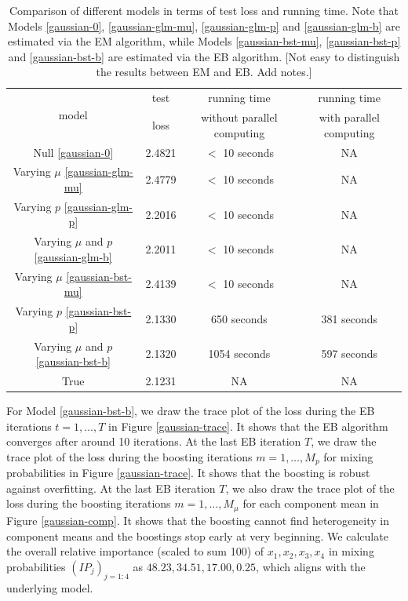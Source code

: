 \documentclass[11pt]{article}
\numberwithin{equation}{section}
\begin{document}
\begin{table}[htp!]
	\caption{Comparison of different models in terms of test loss and running time. Note that Models \eqref{gaussian-0}, \eqref{gaussian-glm-mu}, \eqref{gaussian-glm-p} and \eqref{gaussian-glm-b} are estimated via the EM algorithm, while Models \eqref{gaussian-bst-mu}, \eqref{gaussian-bst-p} and \eqref{gaussian-bst-b} are estimated via the EB algorithm.  {\color{blue}[Not easy to distinguish the results between EM and EB. Add notes.]}}\label{gaussian-summary}
	\centering
	\begin{tabular}{c|ccc}
		\hline
		\multirow{2}{*}{model} & test       & running time               & running time            \\
		& loss & without parallel computing & with parallel computing \\ \hline
		Null \eqref{gaussian-0}                   & 2.4821         & $<$ 10 seconds       & NA    \\
		Varying $\mu$	\eqref{gaussian-glm-mu}                & 2.4779         & $<$ 10 seconds       & NA    \\
		Varying  $p$ \eqref{gaussian-glm-p}                 & 2.2016         & $<$ 10 seconds       & NA   \\
		Varying $\mu$ and $p$ \eqref{gaussian-glm-b}              & 2.2011         & $<$ 10 seconds       & NA   \\
		Varying $\mu$ \eqref{gaussian-bst-mu}                & 2.4139         & $<$ 10 seconds       & NA    \\
		Varying $p$ \eqref{gaussian-bst-p}                 & 2.1330          &            650 seconds                & 381 seconds           \\
		Varying $\mu$ and $p$ \eqref{gaussian-bst-b}              & 2.1320          &              1054 seconds              & 597 seconds               \\
		True                   & 2.1231         &            NA                &               NA         \\ \hline
	\end{tabular}
\end{table}

For Model \eqref{gaussian-bst-b}, we draw the trace plot of the loss during the EB iterations $t=1,\ldots,T$ in Figure \ref{gaussian-trace}.
It shows that the EB algorithm converges after around 10 iterations. 
At the last EB iteration $T$, we draw the trace plot of the loss during the boosting iterations $m=1,\ldots,M_p$ for mixing probabilities in Figure \ref{gaussian-trace}.
It shows that the boosting is robust against overfitting.
At the last EB iteration $T$, we also draw the trace plot of the loss during the boosting iterations $m=1,\ldots,M_\mu$ for each component mean in Figure \ref{gaussian-comp}.
It shows that the boosting cannot find heterogeneity in component means and the boostings stop early at very beginning. 
We calculate the overall relative importance (scaled to sum 100) of $x_1,x_2,x_3,x_4$ in mixing probabilities $(IP_j)_{j=1:4}$ as $48.23,34.51,17.00,0.25$, which aligns with the underlying model.
\end{document}
